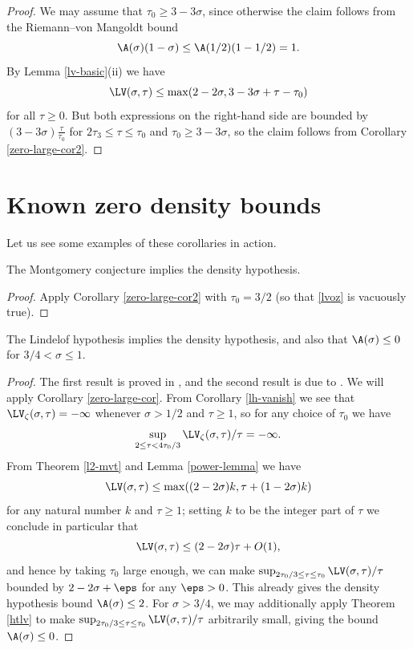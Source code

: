 \begin{proof}  We may assume that $\tau_0 \geq 3-3\sigma$, since otherwise the claim follows from the Riemann--von Mangoldt bound
    $$ \A(\sigma)(1-\sigma) \leq \A(1/2)(1-1/2) = 1.$$
    By Lemma \ref{lv-basic}(ii) we have
$$ \LV(\sigma,\tau) \leq \max( 2-2\sigma, 3-3\sigma + \tau - \tau_0 )$$
for all $\tau \geq 0$.  But both expressions on the right-hand side are bounded by $(3-3\sigma) \frac{\tau}{\tau_0}$ for $2\tau_3 \leq \tau \leq \tau_0$ and $\tau_0 \geq 3-3\sigma$, so the claim follows from Corollary \ref{zero-large-cor2}.
\end{proof}

\section{Known zero density bounds}

Let us see some examples of these corollaries in action.

\begin{theorem}\label{montgomery_implies_density} The Montgomery conjecture implies the density hypothesis.
\end{theorem}

\begin{proof}  Apply Corollary \ref{zero-large-cor2} with $\tau_0=3/2$ (so that \eqref{lvoz} is vacuously true).
\end{proof}

\begin{theorem}\label{lindelof_implies_density} The Lindelof hypothesis implies the density hypothesis, and also that $\A(\sigma) \leq 0$ for $3/4 < \sigma \leq 1$.
\end{theorem}

\begin{proof} The first result is proved in \cite{ingham_estimation_1940}, and the second result is due to \cite{halasz_distribution_1969}. We will apply Corollary \ref{zero-large-cor}.  From Corollary \ref{lh-vanish} we see that $\LV_\zeta(\sigma,\tau) = -\infty$ whenever $\sigma > 1/2$ and $\tau \geq 1$, so for any choice of $\tau_0$ we have
$$ \sup_{2 \leq \tau < 4\tau_0/3} \LV_\zeta(\sigma,\tau)/\tau = -\infty.$$
From Theorem \ref{l2-mvt} and Lemma \ref{power-lemma} we have
\begin{equation}\label{ap}
     \LV(\sigma,\tau) \leq \max( (2-2\sigma)k, \tau + (1 - 2 \sigma)k )
\end{equation}
for any natural number $k$ and $\tau \geq 1$; setting $k$ to be the integer part of $\tau$ we conclude in particular that
$$ \LV(\sigma,\tau) \leq (2-2\sigma)\tau + O(1),$$
and hence by taking $\tau_0$ large enough, we can make
$\sup_{2\tau_0/3 \leq \tau \leq \tau_0} \LV(\sigma,\tau)/\tau$ bounded by $2-2\sigma + \eps$ for any $\eps>0$.  This already gives the density hypothesis bound $\A(\sigma) \leq 2$.  For $\sigma > 3/4$, we may additionally apply Theorem \ref{htlv} to make
$\sup_{2\tau_0/3 \leq \tau \leq \tau_0} \LV(\sigma,\tau)/\tau$ arbitrarily small, giving the bound $\A(\sigma) \leq 0$.
\end{proof}

